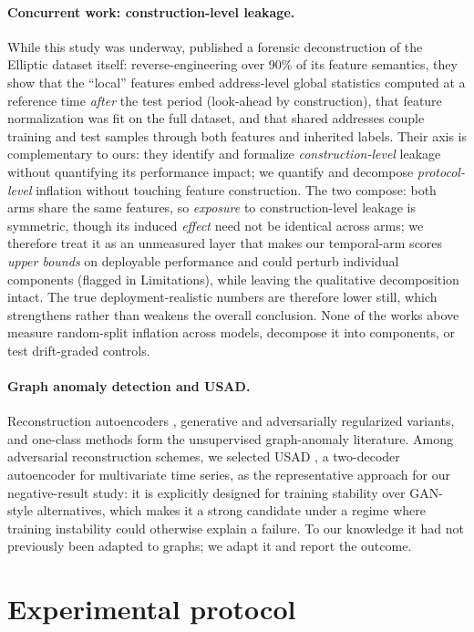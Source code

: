\documentclass{article}
\begin{document}
\paragraph{Concurrent work: construction-level leakage.} While this study was
underway, \citet{safar2026opacity} published a forensic deconstruction of the
Elliptic dataset itself: reverse-engineering over 90\% of its feature semantics,
they show that the ``local'' features embed address-level global statistics
computed at a reference time \emph{after} the test period (look-ahead by
construction), that feature normalization was fit on the full dataset, and that
shared addresses couple training and test samples through both features and
inherited labels. Their axis is complementary to ours: they identify and formalize
\emph{construction-level} leakage without quantifying its performance impact; we
quantify and decompose \emph{protocol-level} inflation without touching feature
construction. The two compose: both arms share the same features, so
\emph{exposure} to construction-level leakage is symmetric, though its induced
\emph{effect} need not be identical across arms; we therefore treat it as an
unmeasured layer that makes our temporal-arm scores \emph{upper bounds} on
deployable performance and could perturb individual components (flagged in
Limitations), while leaving the qualitative decomposition intact. The true
deployment-realistic numbers are therefore lower still, which strengthens rather
than weakens the overall conclusion. None of the works above measure random-split
inflation across models, decompose it into components, or test drift-graded
controls.

\paragraph{Graph anomaly detection and USAD.} Reconstruction autoencoders
\citep{ding2019dominant}, generative and adversarially regularized variants, and
one-class methods form the unsupervised graph-anomaly literature. Among
adversarial reconstruction schemes, we selected USAD \citep{audibert2020usad}, a
two-decoder autoencoder for multivariate time series, as the representative
approach for our negative-result study: it is explicitly designed for training
stability over GAN-style alternatives, which makes it a strong candidate under a
regime where training instability could otherwise explain a failure. To our
knowledge it had not previously been adapted to graphs; we adapt it and report
the outcome.

\section{Experimental protocol}
\label{sec:protocol}
\end{document}
